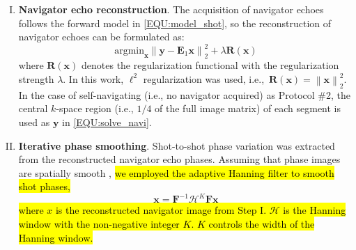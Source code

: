 \documentclass[preprint,12pt,authoryear,review]{elsarticle}
\begin{document}
    \begin{enumerate}[I.]
        \item \textbf{Navigator echo reconstruction}.
        The acquisition of navigator echoes follows the forward model
        in \cref{EQU:model_shot}, so the reconstruction of navigator echoes
        can be formulated as:
        \begin{equation}
            \mathrm{argmin}_\mathbf{x} \left\| \mathbf{y} - \mathbf{E}_1 \mathbf{x} \right\|_2^2
            + \lambda \mathbf{R}(\mathbf{x})
            \label{EQU:solve_navi}
        \end{equation}
    	where $\mathbf{R}(\mathbf{x})$ denotes the regularization functional
    	with the regularization strength $\lambda$.
    	In this work, $\ell^2$ regularization was used,
    	i.e.,~$\mathbf{R}(\mathbf{x}) = \left\lVert \mathbf{x} \right\rVert_2^2$.
        In the case of self-navigating
        (i.e., no navigator acquired) as Protocol \#2,
        the central $k$-space region (i.e., $1/4$ of the full image matrix)
        of each segment is used as $\mathbf{y}$ in \cref{EQU:solve_navi}.


        \item \textbf{Iterative phase smoothing}.
        Shot-to-shot phase variation was extracted from
        the reconstructed navigator echo phases.
        Assuming that phase images are spatially smooth
        \citep{chen_2013_muse,dai_2023_julep},
        \hl{we employed the adaptive Hanning filter to smooth shot phases,}
        \begin{equation}
        	\mathbf{x} = \mathbf{F}^{-1} \mathcal{H}^K \mathbf{F} \mathbf{x}
        	\label{EQU:ITER_PHASE}
        \end{equation}
    	\hl{where \mbox{$x$} is the reconstructed navigator image from Step I.
    	\mbox{$\mathcal{H}$} is the Hanning window
        with the non-negative integer $K$.
        \mbox{$K$} controls the width of the Hanning window.}


\end{enumerate}
\end{document}
